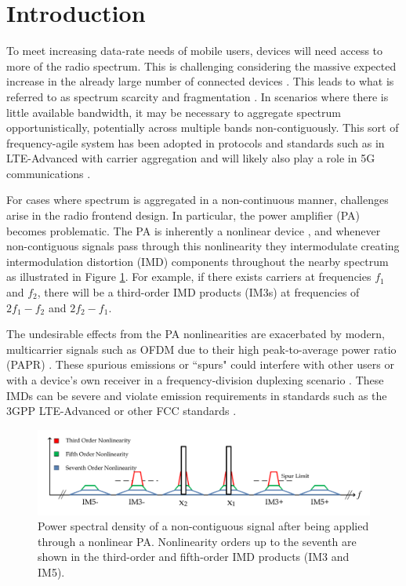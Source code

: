 \section{Introduction}
To meet increasing data-rate needs of mobile users, devices will need access to more of the radio spectrum. 
This is challenging considering the massive expected increase in the already large number of connected devices \cite{Cisco16}.
This leads to what is referred to as spectrum scarcity and fragmentation \cite{Staple04,Federated17}. 
In scenarios where there is little available bandwidth, it may be necessary to aggregate spectrum opportunistically, potentially across multiple bands non-contiguously. 
This sort of frequency-agile system has been adopted in protocols and standards such as in LTE-Advanced with carrier aggregation \cite{wannstrom_2013} and will likely also play a role in 5G communications \cite{Khan2014}.  

For cases where spectrum is aggregated in a non-continuous manner, challenges arise in the radio frontend design. 
In particular, the power amplifier (PA) becomes problematic. 
The PA is inherently a nonlinear device \cite{Ghannouchi09}, and whenever non-contiguous signals pass through this nonlinearity they intermodulate creating intermodulation distortion (IMD) components throughout the nearby spectrum as illustrated in Figure \ref{fig:PSD}. {\color{red} For example, if there exists carriers at frequencies $f_1$ and $f_2$, there will be a third-order IMD products (IM3s) at frequencies of $2f_1 - f_2$ and $2f_2 - f_1$.}


{\color{red} The undesirable effects from the PA nonlinearities are exacerbated by modern, multicarrier signals such as OFDM due to their high peak-to-average power ratio (PAPR) \cite{Ghannouchi09}.}
These spurious emissions or ``spurs" could interfere with other users or with a device's own receiver in a frequency-division duplexing scenario \cite{Park13}. 
These IMDs can be severe and violate emission requirements in standards such as the 3GPP LTE-Advanced or other FCC standards    \cite{Commag_abdelaziz,3GPP_CA_Emissions_1,3GPP_CA_Emissions_2,LaehteensuoMay2013}. 

\begin{figure}
	\centering
	\centerline{\includegraphics[width=\columnwidth]{PSD.pdf}}
	\caption[]{Power spectral density of a non-contiguous signal after being applied through a nonlinear PA.
		Nonlinearity orders up to the seventh are shown in the third-order and fifth-order IMD products (IM3 and IM5).}
	\label{fig:PSD}
\end{figure}

